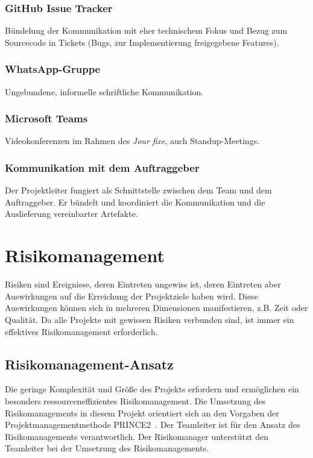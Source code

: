 \documentclass[a4paper,11pt,listof=numbered,glossary=totoc,parskip=half,toc=bib]{scrreprt}
\begin{document}
\subsection{GitHub Issue Tracker}

Bündelung der Kommunikation mit eher technischem Fokus und Bezug zum Sourcecode in Tickets (Bugs, zur Implementierung freigegebene Features).

\subsection{WhatsApp-Gruppe}

Ungebundene, informelle schriftliche Kommunikation.

\subsection{Microsoft Teams}

Videokonferenzen im Rahmen des \textit{Jour fixe}, auch Standup-Meetings.

\subsection{Kommunikation mit dem Auftraggeber}

Der Projektleiter fungiert als Schnittstelle zwischen dem Team und dem Auftraggeber. Er bündelt und koordiniert die Kommunikation und die Auslieferung vereinbarter Artefakte.

	\newpage
	\chapter{Risikomanagement}

Risiken sind Ereignisse, deren Eintreten ungewiss ist, deren Eintreten aber Auswirkungen auf die Erreichung der Projektziele haben wird. Diese Auswirkungen können sich in mehreren Dimensionen manifestieren, z.B. Zeit oder Qualität. Da alle Projekte mit gewissen Risiken verbunden sind, ist immer ein effektives Risikomanagement erforderlich. 

\section{Risikomanagement-Ansatz}

Die geringe Komplexität und Größe des Projekts erfordern und ermöglichen ein besonders ressourceneffizientes Risikomanagement. Die Umsetzung des Risikomanagements in diesem Projekt orientiert sich an den Vorgaben der Projektmanagementmethode PRINCE2\textregistered\ \autocite[S. 119-136, S. 327-330]{Prince2}.
Der Teamleiter ist für den Ansatz des Risikomanagements verantwortlich. Der Risikomanager unterstützt den Teamleiter bei der Umsetzung des Risikomanagements.
\end{document}
